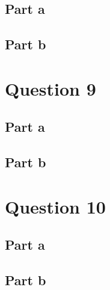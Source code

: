 \documentclass[a3paper 12pt]{article}
\begin{document}
\subsection{Part a}

\subsection{Part b}

\section{Question 9}
\subsection{Part a}

\subsection{Part b}

\section{Question 10}
\subsection{Part a}

\subsection{Part b}

\clearpage
\printbibliography
\end{document}

